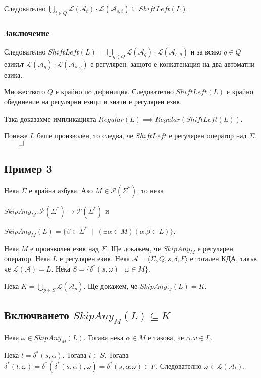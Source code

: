 \documentclass[12pt]{article}
\begin{document}
Следователно \(\displaystyle\bigcup_{t \in Q} \mathcal{L}(\mathcal{A}_t) \cdot \mathcal{L}(\mathcal{A}_{s, t}) \subseteq ShiftLeft(L)\).

\subsubsection*{Заключение}
Следователно \(ShiftLeft(L) = \displaystyle\bigcup_{q \in Q} \mathcal{L}(\mathcal{A}_q) \cdot \mathcal{L}(\mathcal{A}_{s, q})\) и за всяко \(q \in Q\) езикът \(\mathcal{L}(\mathcal{A}_q) \cdot \mathcal{L}(\mathcal{A}_{s, q})\) е регулярен, защото е конкатенация на два автоматни езика.

Множеството \(Q\) е крайно пo дефиниция.
Следователно \(ShiftLeft(L)\) е крайно обединение на регулярни езици и значи е регулярен език.

Така доказахме импликацията \(Regular(L) \implies Regular(ShiftLeft(L))\).

Понеже \(L\) беше произволен, то следва, че \(ShiftLeft\) е регулярен оператор над \(\Sigma\). \(\qed\)

\subsection*{Пример 3}
Нека \(\Sigma\) е крайна азбука. Ако \(M \in \mathcal{P}(\Sigma^*)\), то нека

\(SkipAny_M : \mathcal{P}(\Sigma^*) \to \mathcal{P}(\Sigma^*) \) и

\(SkipAny_M(L) = \{\beta \in \Sigma^* \;\mid\; (\exists \alpha \in M)(\alpha.\beta \in L)\}\).

Нека \(M\) е произволен език над \(\Sigma\). Ще докажем, че \(SkipAny_M\) е регулярен оператор.
Нека \(L\) е регулярен език.
Нека \(\mathcal{A} = \langle \Sigma, Q, s, \delta, F \rangle\) е тотален КДА, такъв че \(\mathcal{L}(\mathcal{A}) = L\).
Нека \(S = \{ \delta^*(s, \omega) \mid \omega \in M \}\).

Нека \(K = \displaystyle\bigcup_{p \in S} \mathcal{L}(\mathcal{A}_p)  \). Ще докажем, че \(SkipAny_M(L) = K\).

\subsection*{Включването \(SkipAny_M(L) \subseteq K\)}
Нека \(\omega \in SkipAny_M(L)\). Тогава нека \(\alpha \in M\) е такова, че \(\alpha.\omega \in L\).

Нека \(t = \delta^*(s, \alpha)\). Тогава \(t \in S\). Тогава \(\delta^*(t, \omega) = \delta^*(\delta^*(s, \alpha), \omega) = \delta^*(s, \alpha.\omega) \in F\). Следователно \(\omega \in \mathcal{L}(\mathcal{A}_t)\).
\end{document}
